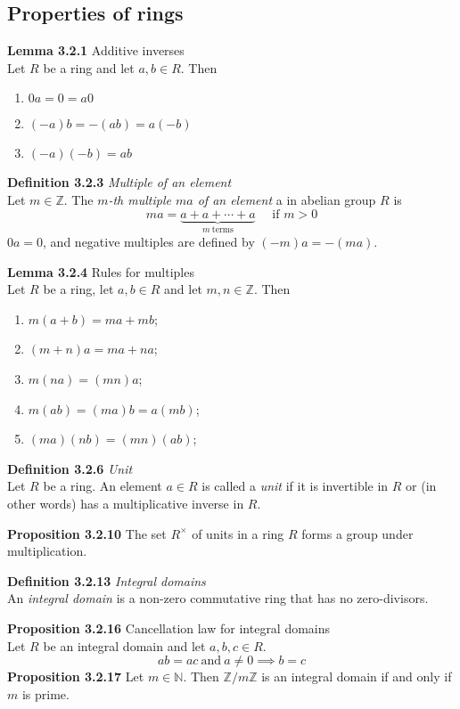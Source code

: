 \documentclass[8pt,landscape]{article}
\begin{document}
\begin{multicols}{3}
    \subsection{Properties of rings}

    \textbf{Lemma 3.2.1} Additive inverses \\
    Let $R$ be a ring and let $a, b \in R$.
    Then
    \begin{enumerate}
        \item $0a = 0 = a0$
        \item $(-a)b = -(ab) = a(-b)$
        \item $(-a)(-b) = ab$
    \end{enumerate}

    \textbf{Definition 3.2.3} \emph{Multiple of an element} \\
    Let $m \in \mathbb{Z}$.
    The \emph{$m$-th multiple $ma$ of an element} a in abelian group $R$ is
    \[
        ma = \underbrace{a + a + \cdots + a}_{m \ \text{terms}} \quad \text{ if } m > 0
    \]
    $0a = 0$, and negative multiples are defined by $(-m)a = -(ma)$.

    \textbf{Lemma 3.2.4} Rules for multiples \\
    Let $R$ be a ring, let $a,b \in R$ and let $m,n \in \mathbb{Z}$.
    Then
    \begin{enumerate}
        \item $m(a+b)   = ma + mb$;
        \item $(m+n)a   = ma + na$;
        \item $m(na)    = (mn)a$;
        \item $m(ab)    = (ma)b      = a(mb)$;
        \item $(ma)(nb) = (mn)(ab)$;
    \end{enumerate}

    \textbf{Definition 3.2.6} \emph{Unit} \\
    Let $R$ be a ring.
    An element $a \in R$ is called a \emph{unit} if it is invertible in $R$ or (in other
    words) has a multiplicative inverse in $R$.

    \textbf{Proposition 3.2.10}
    The set $R^\times$ of units in a ring $R$ forms a group under multiplication.

    \textbf{Definition 3.2.13} \emph{Integral domains} \\
    An \emph{integral domain} is a non-zero commutative ring that has no zero-divisors.

    \textbf{Proposition 3.2.16} Cancellation law for integral domains \\
    Let $R$ be an integral domain and let $a,b,c \in R$.
    \[
        ab = ac \ \text{and} \ a \neq 0 \implies b = c
    \]
    \textbf{Proposition 3.2.17}
    Let $m \in \mathbb{N}$.
    Then $\mathbb{Z}/m\mathbb{Z}$ is an integral domain if and only if $m$ is prime.


\end{multicols}
\end{document}
